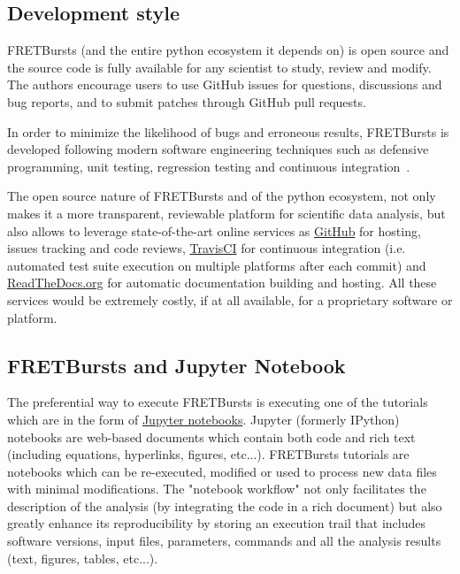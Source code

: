 \subsection{Development style}

FRETBursts (and the entire python ecosystem it depends on) is open source 
and the source code is fully available for any scientist to study, 
review and modify.
The authors encourage users to use GitHub issues for questions, discussions
and bug reports, and to submit patches through GitHub pull requests.

In order to minimize the likelihood of bugs and erroneous results, FRETBursts is developed
following modern software engineering techniques such 
as defensive programming, unit testing, regression testing and continuous integration~\cite{Wilson_2014}.

The open source nature of FRETBursts and of the python ecosystem,
not only makes it a more transparent, reviewable platform 
for scientific data analysis, but also allows 
to leverage state-of-the-art online services as \href{http://https://github.com}{GitHub} for hosting, 
issues tracking and code reviews, 
\href{https://travis-ci.org}{TravisCI} for continuous integration 
(i.e. automated test suite execution on multiple platforms after each commit) 
and \href{https://readthedocs.org/}{ReadTheDocs.org} for automatic documentation building and hosting. 
All these services would be extremely costly, if at all available, 
for a proprietary software or platform.

\subsection{FRETBursts and Jupyter Notebook}

The preferential way to execute FRETBursts is executing one of the tutorials 
which are in the form of \href{http://ipython.org/notebook.html}{Jupyter notebooks}.
Jupyter (formerly IPython) notebooks are web-based documents which contain both 
code and rich text (including equations, hyperlinks, figures, etc...).
FRETBursts tutorials are notebooks which can be re-executed,
modified or used to process new data files with minimal modifications.
The "notebook workflow"\cite{Shen_2014} not only facilitates 
the description of the analysis (by integrating the code in a rich document)
but also greatly enhance its reproducibility by storing an execution trail
that includes software versions, input files, parameters, commands and all
the analysis results (text, figures, tables, etc...).

